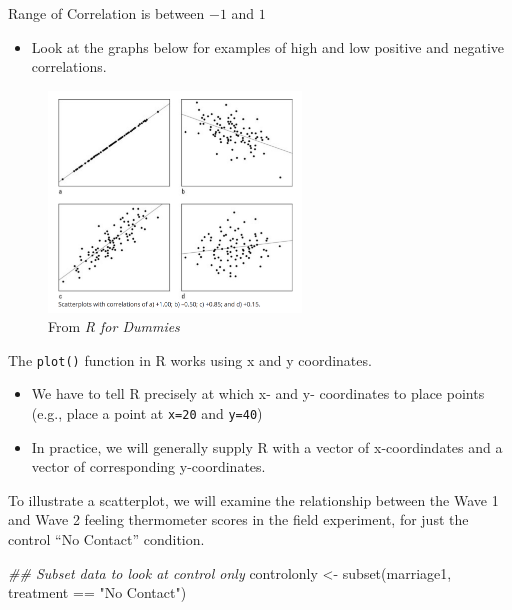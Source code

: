 \documentclass[
  letterpaper,
  DIV=11,
  numbers=noendperiod]{scrreprt}
\newenvironment{Shaded}{\begin{snugshade}}{\end{snugshade}}
\newcommand{\DocumentationTok}[1]{\textcolor[rgb]{0.37,0.37,0.37}{\textit{#1}}}
\newcommand{\FunctionTok}[1]{\textcolor[rgb]{0.28,0.35,0.67}{#1}}
\newcommand{\NormalTok}[1]{\textcolor[rgb]{0.00,0.23,0.31}{#1}}
\newcommand{\OtherTok}[1]{\textcolor[rgb]{0.00,0.23,0.31}{#1}}
\newcommand{\SpecialCharTok}[1]{\textcolor[rgb]{0.37,0.37,0.37}{#1}}
\newcommand{\StringTok}[1]{\textcolor[rgb]{0.13,0.47,0.30}{#1}}
\providecommand{\tightlist}{%
  \setlength{\itemsep}{0pt}\setlength{\parskip}{0pt}}\usepackage{longtable,booktabs,array}
\begin{document}
Range of Correlation is between \(-1\) and \(1\)

\begin{itemize}
\tightlist
\item
  Look at the graphs below for examples of high and low positive and
  negative correlations.
\end{itemize}

\begin{figure}

{\centering \includegraphics[width=0.6\textwidth,height=\textheight]{images/corrdummies.png}

}

\caption{From \emph{R for Dummies}}

\end{figure}

The \texttt{plot()} function in R works using x and y coordinates.

\begin{itemize}
\tightlist
\item
  We have to tell R precisely at which x- and y- coordinates to place
  points (e.g., place a point at \texttt{x=20} and \texttt{y=40})
\item
  In practice, we will generally supply R with a vector of
  x-coordindates and a vector of corresponding y-coordinates.
\end{itemize}

To illustrate a scatterplot, we will examine the relationship between
the Wave 1 and Wave 2 feeling thermometer scores in the field
experiment, for just the control ``No Contact'' condition.

\begin{Shaded}
\begin{Highlighting}[]
\DocumentationTok{\#\# Subset data to look at control only}
\NormalTok{controlonly }\OtherTok{\textless{}{-}} \FunctionTok{subset}\NormalTok{(marriage1, treatment }\SpecialCharTok{==} \StringTok{"No Contact"}\NormalTok{)}
\end{Highlighting}
\end{Shaded}
\end{document}
